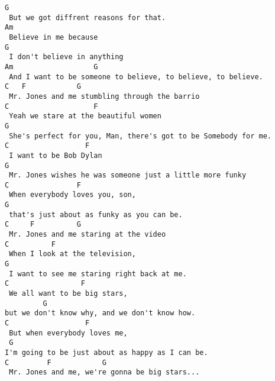 \begin{verbatim}
G 
 But we got diffrent reasons for that. 
Am 
 Believe in me because 
G 
 I don't believe in anything 
Am                   G 
 And I want to be someone to believe, to believe, to believe. 
C   F            G 
 Mr. Jones and me stumbling through the barrio 
C                    F 
 Yeah we stare at the beautiful women 
G 
 She's perfect for you, Man, there's got to be Somebody for me. 
C                  F 
 I want to be Bob Dylan  
G 
 Mr. Jones wishes he was someone just a little more funky 
C                F 
 When everybody loves you, son, 
G 
 that's just about as funky as you can be. 
C     F          G 
 Mr. Jones and me staring at the video 
C          F 
 When I look at the television, 
G 
 I want to see me staring right back at me. 
C                 F 
 We all want to be big stars, 
         G 
but we don't know why, and we don't know how. 
C                  F 
 But when everybody loves me, 
 G 
I'm going to be just about as happy as I can be. 
C         F            G 
 Mr. Jones and me, we're gonna be big stars...
\end{verbatim}

